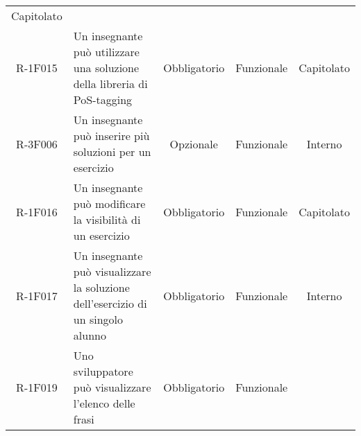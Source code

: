 \begin{tabularx}{\textwidth}{cXccc}
Capitolato \\
R-1F015 &

Un insegnante può utilizzare una soluzione della libreria di PoS-tagging &

Obbligatorio &

Funzionale &

Capitolato \\
R-3F006 &


Un insegnante può inserire più soluzioni per un esercizio &

Opzionale &

Funzionale &

Interno \\
R-1F016 &

Un insegnante può modificare la visibilità di un esercizio&

Obbligatorio &

Funzionale &

Capitolato \\
R-1F017 &

Un insegnante può visualizzare la soluzione dell’esercizio di un singolo alunno &

Obbligatorio &

Funzionale &

Interno \\
R-1F019 &

Uno sviluppatore può visualizzare l’elenco delle frasi &

Obbligatorio &

Funzionale &


\end{tabularx}
